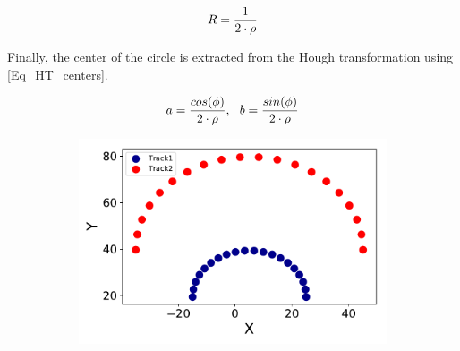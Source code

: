 \documentclass{cernatsnote}
\begin{document}
\begin{equation}
	R = {1 \over {2 \cdot \rho}}
	\label{Eq_R_rho}
\end{equation}

Finally, the center of the circle is extracted from the Hough transformation using \cref{Eq_HT_centers}.


\begin{equation}
	a = {cos(\phi) \over {2 \cdot \rho}},
\,\,\,\,
	b = {sin(\phi) \over {2 \cdot \rho}}
\label{Eq_HT_centers}
\end{equation}


\begin{figure}[ht]
	\centering
	\begin{subfigure}[b]{0.3\textwidth}
        \includegraphics[width=\textwidth]{figures/circle.pdf}
        \caption{}


\end{subfigure}
\end{figure}
\end{document}
